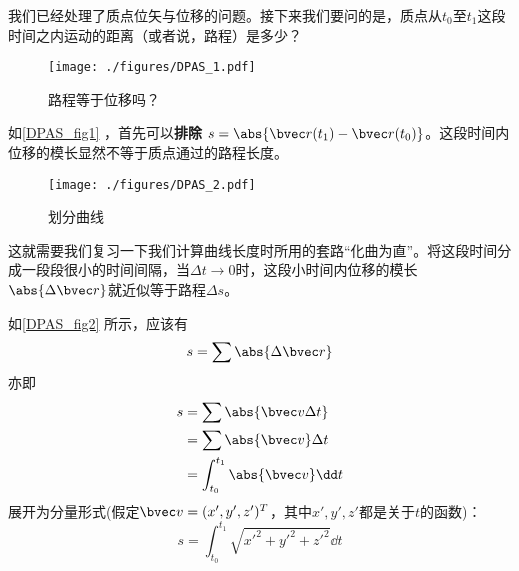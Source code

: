 
我们已经处理了质点位矢与位移的问题。接下来我们要问的是，质点从$t_0$至$t_1$这段时间之内运动的距离（或者说，路程）是多少？

\begin{figure}[ht]
\centering
\texttt{[image: ./figures/DPAS\_1.pdf]}
\caption{路程等于位移吗？} \label{DPAS_fig1}
\end{figure}

如\autoref{DPAS_fig1} ，首先可以\textbf{排除} $s = \abs{\bvec r(t_1) - \bvec r(t_0)}  $。这段时间内位移的模长显然不等于质点通过的路程长度。

\begin{figure}[ht]
\centering
\texttt{[image: ./figures/DPAS\_2.pdf]}
\caption{划分曲线} \label{DPAS_fig2}
\end{figure}

这就需要我们复习一下我们计算曲线长度时所用的套路“化曲为直”。将这段时间分成一段段很小的时间间隔，当$\Delta t \to 0$时，这段小时间内位移的模长$\abs{\Delta \bvec r}$就近似等于路程$\Delta s$。

如\autoref{DPAS_fig2} 所示，应该有 $$s=\sum \abs{\Delta \bvec r}$$
亦即$$
\begin{aligned}
s&=\sum \abs{\bvec v \Delta t}\\
&=\sum \abs{\bvec v} \Delta t\\
&=\int _{t_0}^{t_1} \abs{\bvec v} \dd t\\
\end{aligned}
$$
展开为分量形式(假定$\bvec v = (x',y',z')^T$，其中$x',y',z'$都是关于$t$的函数)：
$$
s = \int _{t_0}^{t_1} \sqrt{x'^2+y'^2+z'^2} \dd t
$$
